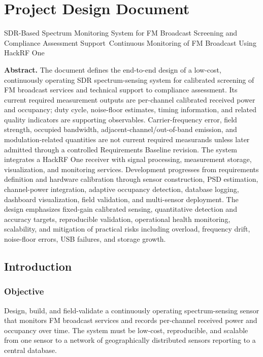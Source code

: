 \documentclass[12pt,a4paper]{report}
\begin{document}
\chapter{Project Design Document}	
\begin{center}
{{\Large SDR-Based Spectrum Monitoring System for FM Broadcast Screening and Compliance Assessment Support}\;\
{\large Continuous Monitoring of FM Broadcast Using HackRF One}
}
\end{center}
\textbf{Abstract.}
The document defines the end-to-end design of a low-cost, continuously operating SDR spectrum-sensing system for calibrated screening of FM broadcast services and technical support to compliance assessment. Its current required measurement outputs are per-channel calibrated received power and occupancy; duty cycle, noise-floor estimates, timing information, and related quality indicators are supporting observables. Carrier-frequency error, field strength, occupied bandwidth, adjacent-channel/out-of-band emission, and modulation-related quantities are not current required measurands unless later admitted through a controlled Requirements Baseline revision.
The system integrates a HackRF One receiver with signal processing, measurement storage, visualization, and monitoring services. Development progresses from requirements definition and hardware calibration through sensor construction, PSD estimation, channel-power integration, adaptive occupancy detection, database logging, dashboard visualization, field validation, and multi-sensor deployment.
 The design emphasizes fixed-gain calibrated sensing, quantitative detection and accuracy targets, reproducible validation, operational health monitoring, scalability, and mitigation of practical risks including overload, frequency drift, noise-floor errors, USB failures, and storage growth.
 \section{Introduction}
 \subsection*{Objective}
 Design, build, and field-validate a continuously operating spectrum-sensing
 sensor that monitors FM broadcast services and records per-channel received
 power and occupancy over time. The system must be low-cost, reproducible, and
 scalable from one sensor to a network of geographically distributed sensors
 reporting to a central database.
\end{document}

